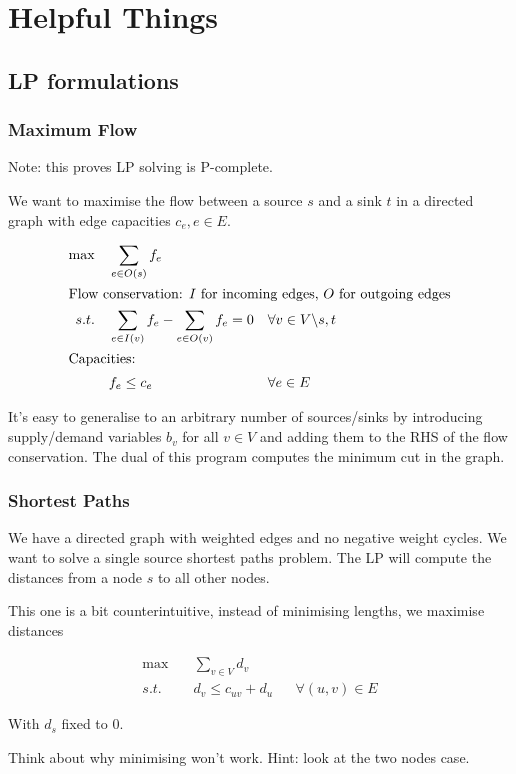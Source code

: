 \appendix
\chapter{Helpful Things}
\section{LP formulations}
\subsection{Maximum Flow}
Note: this proves LP solving is P-complete.

We want to maximise the flow between a source $s$ and a sink $t$ in a directed graph with edge capacities $c_e, e\in E$.

\begin{align*}
\max \quad & \sum_{e\in O(s)} f_e\\
\intertext{Flow conservation: $I$ for incoming edges, $O$ for outgoing edges}
s.t.\quad	& \sum_{e\in I(v)} f_e - \sum_{e\in O(v)} f_e = 0 && \forall v\in V\backslash {s,t}\\
\intertext{Capacities:}
	& f_e \leq c_e && \forall e \in E\\
\end{align*}

It's easy to generalise to an arbitrary number of sources/sinks by introducing supply/demand variables $b_v$ for all $v\in V$ and adding them to the RHS of the flow conservation. The dual of this program computes the minimum cut in the graph.

\subsection{Shortest Paths}

We have a directed graph with weighted edges and no negative weight cycles. We want to solve a single source shortest paths problem. The LP will compute the distances from a node $s$ to all other nodes.

This one is a bit counterintuitive, instead of minimising lengths, we maximise distances

\begin{align*}
\max \quad & \sum_{v\in V} d_v\\
s.t. \quad & d_v \leq c_{uv} + d_u && \forall (u,v) \in E
\end{align*}

With $d_s$ fixed to 0. 

Think about why minimising won't work. Hint: look at the two nodes case.


